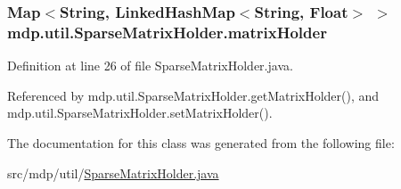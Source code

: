 \subsubsection[{matrix\+Holder}]{\setlength{\rightskip}{0pt plus 5cm}Map$<$String, Linked\+Hash\+Map$<$String, Float$>$ $>$ mdp.\+util.\+Sparse\+Matrix\+Holder.\+matrix\+Holder\hspace{0.3cm}{\ttfamily [private]}}\label{classmdp_1_1util_1_1_sparse_matrix_holder_a3d366c32341591c38a025f75ef755401}


Definition at line 26 of file Sparse\+Matrix\+Holder.\+java.



Referenced by mdp.\+util.\+Sparse\+Matrix\+Holder.\+get\+Matrix\+Holder(), and mdp.\+util.\+Sparse\+Matrix\+Holder.\+set\+Matrix\+Holder().



The documentation for this class was generated from the following file\+:\begin{DoxyCompactItemize}
\item 
src/mdp/util/\hyperlink{_sparse_matrix_holder_8java}{Sparse\+Matrix\+Holder.\+java}\end{DoxyCompactItemize}
